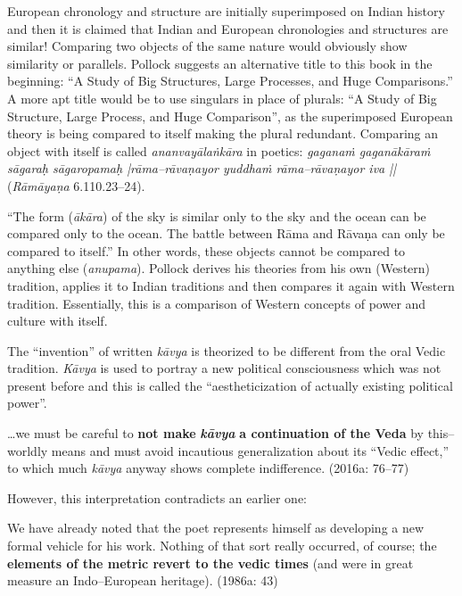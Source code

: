{{{European chronology and structure are initially superimposed on Indian history and then it is claimed that Indian and European chronologies and structures are similar! Comparing two objects of the same nature would obviously show similarity or parallels. Pollock suggests an alternative title to this book in the beginning: “A Study of Big Structures, Large Processes, and Huge Comparisons.” A more apt title would be to use singulars in place of plurals: “A Study of Big Structure, Large Process, and Huge Comparison”, as the superimposed European theory is being compared to itself making the plural redundant. Comparing an object with itself is called \textit{ananvayālaṅkāra} in poetics: \textit{gaganaṁ gaganākāraṁ sāgaraḥ sāgaropamaḥ |rāma–rāvaṇayor yuddhaṁ rāma–rāvaṇayor iva || }(\textit{Rāmāyaṇa} 6.110.23–24).

“The form (\textit{ākāra}) of the sky is similar only to the sky and the ocean can be compared only to the ocean. The battle between Rāma and Rāvaṇa can only be compared to itself.” In other words, these objects cannot be compared to anything else (\textit{anupama}). Pollock derives his theories from his own (Western) tradition, applies it to Indian traditions and then compares it again with Western tradition. Essentially, this is a comparison of Western concepts of power and culture with itself.

The “invention” of written \textit{kāvya} is theorized to be different from the oral Vedic tradition. \textit{Kāvya }is used to portray a new political consciousness which was not present before and this is called the “aestheticization of actually existing political power”.

\begin{myquote}
…we must be careful to \textbf{not make }\textit{\textbf{kāvya }}\textbf{a continuation of the Veda} by this–worldly means and must avoid incautious generalization about its “Vedic effect,” to which much\textit{ kāvya }anyway shows complete indifference. (2016a: 76–77)
\end{myquote}

\newpage

However, this interpretation contradicts an earlier one:

\begin{myquote}
We have already noted that the poet represents himself as developing a new formal vehicle for his work. Nothing of that sort really occurred, of course; the \textbf{elements of the metric revert to the vedic times} (and were in great measure an Indo–European heritage). (1986a: 43)
\end{myquote}

}}}
